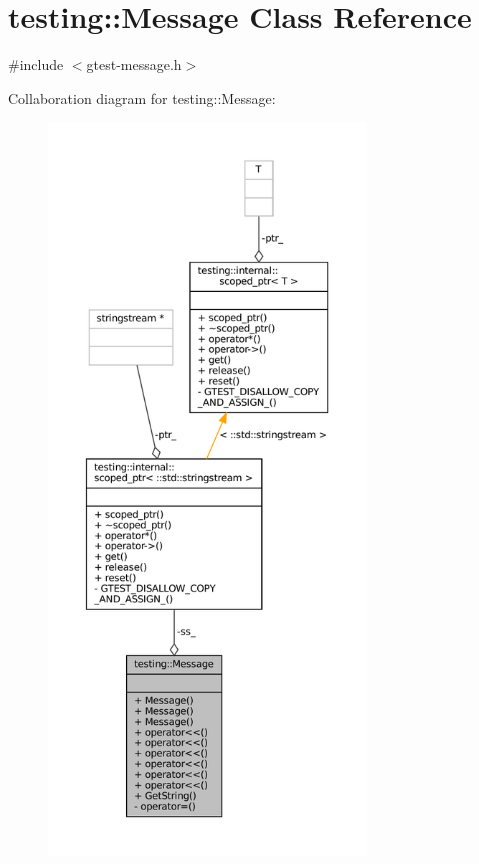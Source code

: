 \hypertarget{classtesting_1_1Message}{}\section{testing\+:\+:Message Class Reference}
\label{classtesting_1_1Message}


{\ttfamily \#include $<$gtest-\/message.\+h$>$}



Collaboration diagram for testing\+:\+:Message\+:
\nopagebreak
\begin{figure}[H]
\begin{center}
\leavevmode
\includegraphics[height=550pt]{classtesting_1_1Message__coll__graph}
\end{center}
\end{figure}
